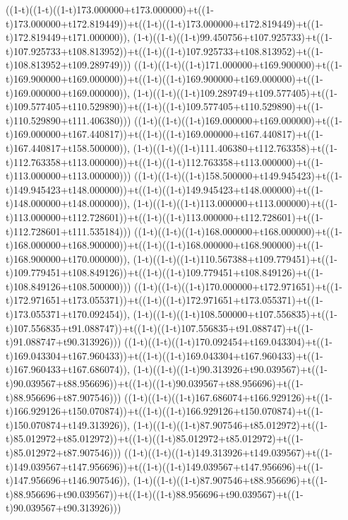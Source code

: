((1-t)((1-t)((1-t)173.000000+t173.000000)+t((1-t)173.000000+t172.819449))+t((1-t)((1-t)173.000000+t172.819449)+t((1-t)172.819449+t171.000000)),                                     (1-t)((1-t)((1-t)99.450756+t107.925733)+t((1-t)107.925733+t108.813952))+t((1-t)((1-t)107.925733+t108.813952)+t((1-t)108.813952+t109.289749)))
((1-t)((1-t)((1-t)171.000000+t169.900000)+t((1-t)169.900000+t169.000000))+t((1-t)((1-t)169.900000+t169.000000)+t((1-t)169.000000+t169.000000)),                                     (1-t)((1-t)((1-t)109.289749+t109.577405)+t((1-t)109.577405+t110.529890))+t((1-t)((1-t)109.577405+t110.529890)+t((1-t)110.529890+t111.406380)))
((1-t)((1-t)((1-t)169.000000+t169.000000)+t((1-t)169.000000+t167.440817))+t((1-t)((1-t)169.000000+t167.440817)+t((1-t)167.440817+t158.500000)),                                     (1-t)((1-t)((1-t)111.406380+t112.763358)+t((1-t)112.763358+t113.000000))+t((1-t)((1-t)112.763358+t113.000000)+t((1-t)113.000000+t113.000000)))
((1-t)((1-t)((1-t)158.500000+t149.945423)+t((1-t)149.945423+t148.000000))+t((1-t)((1-t)149.945423+t148.000000)+t((1-t)148.000000+t148.000000)),                                     (1-t)((1-t)((1-t)113.000000+t113.000000)+t((1-t)113.000000+t112.728601))+t((1-t)((1-t)113.000000+t112.728601)+t((1-t)112.728601+t111.535184)))
((1-t)((1-t)((1-t)168.000000+t168.000000)+t((1-t)168.000000+t168.900000))+t((1-t)((1-t)168.000000+t168.900000)+t((1-t)168.900000+t170.000000)),                                     (1-t)((1-t)((1-t)110.567388+t109.779451)+t((1-t)109.779451+t108.849126))+t((1-t)((1-t)109.779451+t108.849126)+t((1-t)108.849126+t108.500000)))
((1-t)((1-t)((1-t)170.000000+t172.971651)+t((1-t)172.971651+t173.055371))+t((1-t)((1-t)172.971651+t173.055371)+t((1-t)173.055371+t170.092454)),                                     (1-t)((1-t)((1-t)108.500000+t107.556835)+t((1-t)107.556835+t91.088747))+t((1-t)((1-t)107.556835+t91.088747)+t((1-t)91.088747+t90.313926)))
((1-t)((1-t)((1-t)170.092454+t169.043304)+t((1-t)169.043304+t167.960433))+t((1-t)((1-t)169.043304+t167.960433)+t((1-t)167.960433+t167.686074)),                                     (1-t)((1-t)((1-t)90.313926+t90.039567)+t((1-t)90.039567+t88.956696))+t((1-t)((1-t)90.039567+t88.956696)+t((1-t)88.956696+t87.907546)))
((1-t)((1-t)((1-t)167.686074+t166.929126)+t((1-t)166.929126+t150.070874))+t((1-t)((1-t)166.929126+t150.070874)+t((1-t)150.070874+t149.313926)),                                     (1-t)((1-t)((1-t)87.907546+t85.012972)+t((1-t)85.012972+t85.012972))+t((1-t)((1-t)85.012972+t85.012972)+t((1-t)85.012972+t87.907546)))
((1-t)((1-t)((1-t)149.313926+t149.039567)+t((1-t)149.039567+t147.956696))+t((1-t)((1-t)149.039567+t147.956696)+t((1-t)147.956696+t146.907546)),                                     (1-t)((1-t)((1-t)87.907546+t88.956696)+t((1-t)88.956696+t90.039567))+t((1-t)((1-t)88.956696+t90.039567)+t((1-t)90.039567+t90.313926)))
